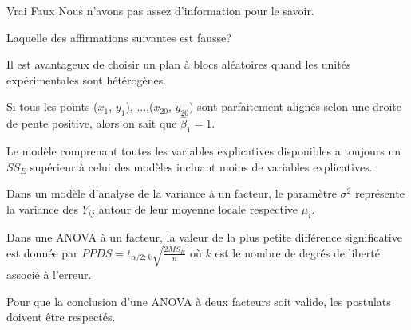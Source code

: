 \begin{questions}
\begin{parts}
\medskip   \begin{oneparcheckboxes}
        \choice Vrai 
        \CorrectChoice Faux
        \choice Nous n'avons pas assez d'information pour le savoir.
\medskip    \end{oneparcheckboxes}
    


\end{parts}
\medskip

\question[3]\label{QCManovaReg}

Laquelle des affirmations suivantes est fausse?

\medskip

\begin{checkboxes}
\choice Il est avantageux de choisir un plan à blocs aléatoires quand les unités expérimentales sont hétérogènes.

\CorrectChoice Si tous les points ($x_1$, $y_1$), ...,($x_{20}$, $y_{20}$) sont parfaitement alignés selon une droite de pente positive, alors on sait que $\widehat{\beta}_1 =1$.

\choice Le modèle comprenant toutes les variables explicatives disponibles a toujours un $SS_E$ supérieur à celui des modèles incluant moins de variables explicatives.

\choice Dans un modèle d’analyse de la variance à un facteur, le paramètre $\sigma^2$ représente la variance
des $Y_{ij}$ autour de leur moyenne locale respective $\mu_i$.

\choice Dans une ANOVA à un facteur, la valeur de la plus petite différence significative est donnée par $PPDS=t_{\alpha/2; k} \sqrt{\frac{2MS_E}{n}}$ où $k$ est le nombre de degrés de liberté associé à l'erreur.

\choice Pour que la conclusion d'une ANOVA à deux facteurs soit valide, les postulats doivent être respectés.\medskip
\end{checkboxes}

\medskip


\end{questions}
